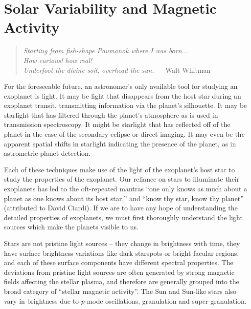 \documentclass[12pt, twoside]{uwthesis}
\begin{document}


\part{Solar Variability and Magnetic Activity} \label{part:solaractivity}

\begin{quote}
{\it Starting from fish-shape Paumanok where I was born...\\
How curious! how real!\\
Underfoot the divine soil, overhead the sun.}
\hfill --- Walt Whitman
\end{quote}

For the foreseeable future, an astronomer's only available tool for studying an exoplanet is light. It may be light that disappears from the host star during an exoplanet transit, transmitting information via the planet's silhouette. It may be starlight that has filtered through the planet's atmosphere as is used in transmission spectroscopy. It might be starlight that has reflected off of the planet in the case of the secondary eclipse or direct imaging. It may even be the apparent spatial shifts in starlight indicating the presence of the planet, as in astrometric planet detection.

Each of these techniques make use of the light of the exoplanet's host star to study the properties of the exoplanet. Our reliance on stars to illuminate their exoplanets has led to the oft-repeated mantras ``one only knows as much about a planet as one knows about its host star,'' and ``know thy star, know thy planet'' (attributed to David Ciardi). If we are to have any hope of understanding the detailed properties of exoplanets, we must first thoroughly understand the light sources which make the planets visible to us. 

Stars are not pristine light sources -- they change in brightness with time, they have surface brightness variations like dark starspots or bright facular regions, and each of these surface components have different spectral properties. The deviations from pristine light sources are often generated by strong magnetic fields affecting the stellar plasma, and therefore are generally grouped into the broad category of ``stellar magnetic activity''. The Sun and Sun-like stars also vary in brightness due to $p$-mode oscillations, granulation and super-granulation.
\end{document}
